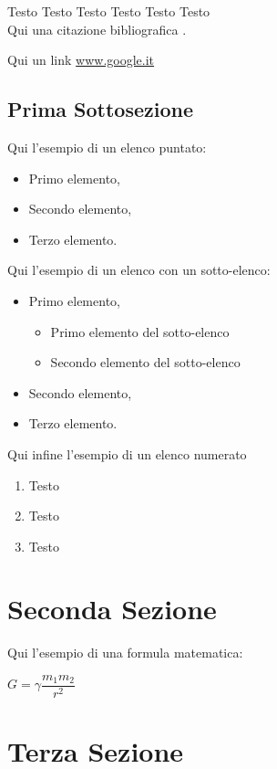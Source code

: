 \LARGE{Testo} \Large{Testo} \large{Testo} \normalsize{Testo} \small{Testo} \footnotesize{Testo}\\

Qui una citazione bibliografica \cite{bib001}.

Qui un link \url{www.google.it}


\subsection{Prima Sottosezione}

Qui l'esempio di un elenco puntato:

\begin{itemize}
\item Primo elemento,
\item Secondo elemento,
\item Terzo elemento.
\end{itemize}

Qui l'esempio di un elenco con un sotto-elenco:

\begin{itemize}
\item Primo elemento,
\begin{itemize}
\item Primo elemento del sotto-elenco
\item Secondo elemento del sotto-elenco
\end{itemize}
\item Secondo elemento,
\item Terzo elemento.
\end{itemize}

Qui infine l'esempio di un elenco numerato

\begin{enumerate}
\item Testo
\item Testo
\item Testo
\end{enumerate}

\section{Seconda Sezione}\label{sec:Sezione2}

Qui l'esempio di una formula matematica:

$ G = \gamma\dfrac{m_{1}m_{2}}{r^{2}} $

\section{Terza Sezione}

